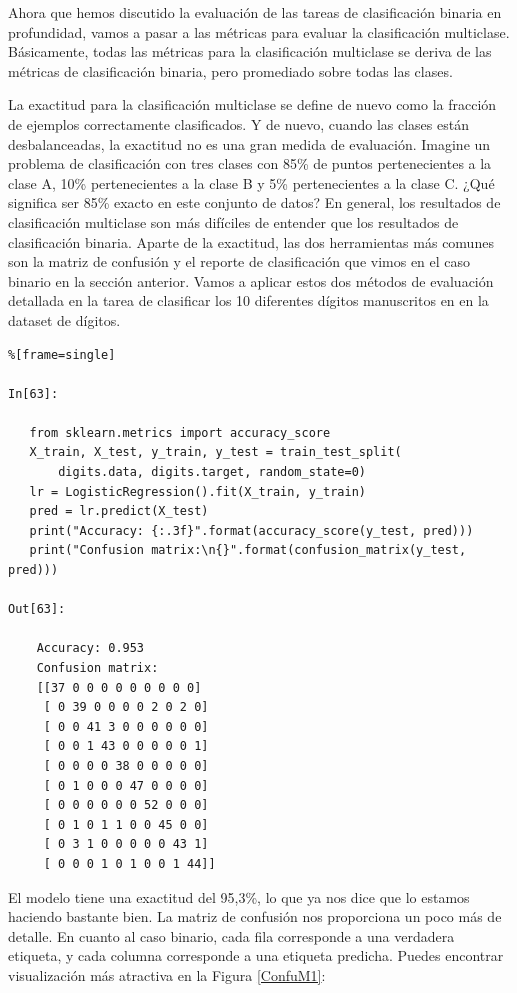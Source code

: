 {Ahora que hemos discutido la evaluación de las tareas de clasificación binaria en profundidad, vamos a
pasar a las métricas para evaluar la clasificación multiclase. Básicamente, todas las métricas para
la clasificación multiclase se deriva de las métricas de clasificación binaria, pero promediado
sobre todas las clases.

La exactitud para la clasificación multiclase se define de nuevo como la fracción de ejemplos correctamente clasificados. Y de nuevo, cuando las clases están desbalanceadas, la exactitud no es una gran medida de evaluación. Imagine un problema de clasificación con tres clases con 85\% de puntos pertenecientes a la clase A, 10\% pertenecientes a la clase B y 5\% pertenecientes a la clase C.  ¿Qué significa ser 85\% exacto en este conjunto de datos? En general, los resultados de clasificación multiclase son más difíciles de entender que los resultados de clasificación binaria. Aparte de la exactitud, las dos herramientas más comunes son la matriz de confusión y el reporte de clasificación que vimos en el caso binario en la sección anterior. Vamos a aplicar estos dos métodos de evaluación detallada en la tarea de clasificar los 10  diferentes dígitos manuscritos en en la dataset de dígitos.



\begin{lstlisting}%[frame=single]

In[63]:

   from sklearn.metrics import accuracy_score
   X_train, X_test, y_train, y_test = train_test_split(
       digits.data, digits.target, random_state=0)
   lr = LogisticRegression().fit(X_train, y_train)
   pred = lr.predict(X_test)
   print("Accuracy: {:.3f}".format(accuracy_score(y_test, pred)))
   print("Confusion matrix:\n{}".format(confusion_matrix(y_test, pred)))

Out[63]:

    Accuracy: 0.953
    Confusion matrix:
    [[37 0 0 0 0 0 0 0 0 0]
     [ 0 39 0 0 0 0 2 0 2 0]
     [ 0 0 41 3 0 0 0 0 0 0]
     [ 0 0 1 43 0 0 0 0 0 1]
     [ 0 0 0 0 38 0 0 0 0 0]
     [ 0 1 0 0 0 47 0 0 0 0]
     [ 0 0 0 0 0 0 52 0 0 0]
     [ 0 1 0 1 1 0 0 45 0 0]
     [ 0 3 1 0 0 0 0 0 43 1]
     [ 0 0 0 1 0 1 0 0 1 44]]

\end{lstlisting}


El modelo tiene una exactitud del 95,3\%, lo que ya nos dice que lo estamos haciendo bastante bien. La matriz de confusión nos proporciona un poco más de detalle. En cuanto al caso binario, cada fila corresponde a una verdadera etiqueta, y cada columna corresponde a una etiqueta predicha. Puedes encontrar  visualización  más atractiva en la Figura \ref{ConfuM1}:


}
